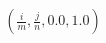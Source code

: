 \documentclass[preview]{standalone}
\begin{document}
\begin{align*}
\left( \frac{i}{m}, \frac{j}{n}, 0.0, 1.0 \right)
\end{align*}
\end{document}
